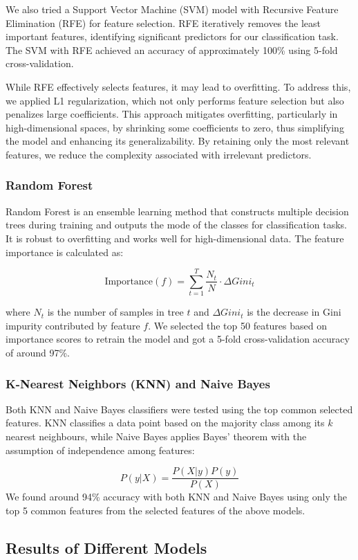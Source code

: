 \documentclass[a4paper,12pt]{article}
\begin{document}
We also tried a Support Vector Machine (SVM) model with Recursive Feature Elimination (RFE) for feature selection. RFE iteratively removes the least important features, identifying significant predictors for our classification task. The SVM with RFE achieved an accuracy of approximately 100\% using 5-fold cross-validation.

While RFE effectively selects features, it may lead to overfitting. To address this, we applied L1 regularization, which not only performs feature selection but also penalizes large coefficients. This approach mitigates overfitting, particularly in high-dimensional spaces, by shrinking some coefficients to zero, thus simplifying the model and enhancing its generalizability. By retaining only the most relevant features, we reduce the complexity associated with irrelevant predictors.


\subsubsection{Random Forest}
Random Forest is an ensemble learning method that constructs multiple decision trees during training and outputs the mode of the classes for classification tasks. It is robust to overfitting and works well for high-dimensional data. The feature importance is calculated as:

\[
	\text{Importance}(f) = \sum_{t=1}^{T} \frac{N_{t}}{N} \cdot \Delta Gini_t
\]

where \( N_t \) is the number of samples in tree \( t \) and \( \Delta Gini_t \) is the decrease in Gini impurity contributed by feature \( f \). We selected the top 50 features based on importance scores to retrain the model and got a 5-fold cross-validation accuracy of around 97\%.


\subsubsection{K-Nearest Neighbors (KNN) and Naive Bayes}
Both KNN and Naive Bayes classifiers were tested using the top common selected features. KNN classifies a data point based on the majority class among its \( k \) nearest neighbours, while Naive Bayes applies Bayes' theorem with the assumption of independence among features:

\[
	P(y|X) = \frac{P(X|y)P(y)}{P(X)}
\]
We found around 94\% accuracy with both KNN and Naive Bayes using only the top 5 common features from the selected features of the above models.
\subsection{Results of Different Models}
\end{document}
